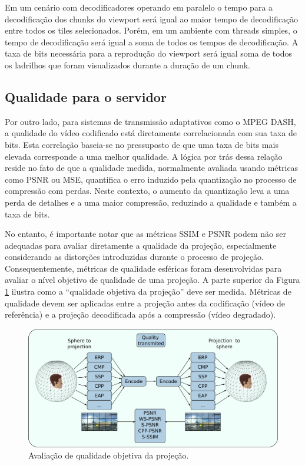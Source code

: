Em um cenário com decodificadores operando em paralelo o tempo para a decodificação dos chunks do viewport será igual ao maior tempo de decodificação entre todos os tiles selecionados. Porém, em um ambiente com threads simples, o tempo de decodificação será igual a soma de todos os tempos de decodificação. A taxa de bits necessária para a reprodução do viewport será igual soma de todos os ladrilhos que foram visualizados durante a duração de um chunk.

\subsection{Qualidade para o servidor}

Por outro lado, para sistemas de transmissão adaptativos como o MPEG DASH, a qualidade do vídeo codificado está diretamente correlacionada com sua taxa de bits. Esta correlação baseia-se no pressuposto de que uma taxa de bits mais elevada corresponde a uma melhor qualidade. A lógica por trás dessa relação reside no fato de que a qualidade medida, normalmente avaliada usando métricas como PSNR ou MSE, quantifica o erro induzido pela quantização no processo de compressão com perdas. Neste contexto, o aumento da quantização leva a uma perda de detalhes e a uma maior compressão, reduzindo a qualidade e também a taxa de bits.

No entanto, é importante notar que as métricas SSIM e PSNR podem não ser adequadas para avaliar diretamente a qualidade da projeção, especialmente considerando as distorções introduzidas durante o processo de projeção. Consequentemente, métricas de qualidade esféricas foram desenvolvidas para avaliar o nível objetivo de qualidade de uma projeção. A parte superior da Figura \ref{fig:QualityDiagram} ilustra como a “qualidade objetiva da projeção” deve ser medida. Métricas de qualidade devem ser aplicadas entre a projeção antes da codificação (vídeo de referência) e a projeção decodificada após a compressão (vídeo degradado).

\begin{figure}[htb]
        \centering
        \includegraphics[width=0.7\linewidth]{fig/diagrama e qualidade 1.png}
        \caption{Avaliação de qualidade objetiva da projeção.}
        \label{fig:QualityDiagram}
\end{figure}

